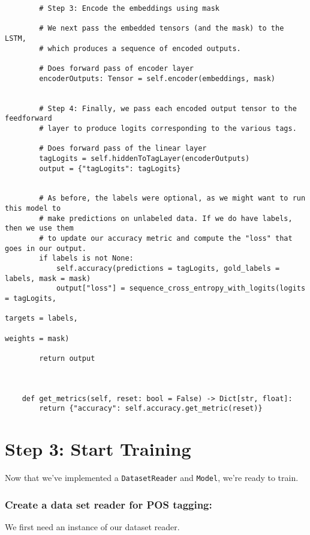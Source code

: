 \documentclass[
]{article}
\begin{document}
\begin{verbatim}
        # Step 3: Encode the embeddings using mask

        # We next pass the embedded tensors (and the mask) to the LSTM,
        # which produces a sequence of encoded outputs.

        # Does forward pass of encoder layer
        encoderOutputs: Tensor = self.encoder(embeddings, mask)


        # Step 4: Finally, we pass each encoded output tensor to the feedforward
        # layer to produce logits corresponding to the various tags.

        # Does forward pass of the linear layer
        tagLogits = self.hiddenToTagLayer(encoderOutputs)
        output = {"tagLogits": tagLogits}


        # As before, the labels were optional, as we might want to run this model to
        # make predictions on unlabeled data. If we do have labels, then we use them
        # to update our accuracy metric and compute the "loss" that goes in our output.
        if labels is not None:
            self.accuracy(predictions = tagLogits, gold_labels = labels, mask = mask)
            output["loss"] = sequence_cross_entropy_with_logits(logits = tagLogits,
                                                                targets = labels,
                                                                weights = mask)

        return output



    def get_metrics(self, reset: bool = False) -> Dict[str, float]:
        return {"accuracy": self.accuracy.get_metric(reset)}
\end{verbatim}

\hypertarget{step-3-start-training}{%
\section{Step 3: Start Training}\label{step-3-start-training}}

Now that we've implemented a \texttt{DatasetReader} and \texttt{Model},
we're ready to train.

\hypertarget{create-a-data-set-reader-for-pos-tagging}{%
\subsubsection{Create a data set reader for POS
tagging:}\label{create-a-data-set-reader-for-pos-tagging}}

We first need an instance of our dataset reader.
\end{document}
